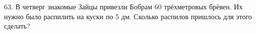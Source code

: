 63. В четверг знакомые Зайцы привезли Бобрам 60 трёхметровых брёвен. Их нужно было распилить на куски по 5 дм. Сколько распилов пришлось для этого сделать?\\
